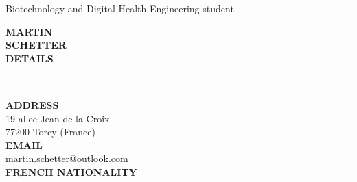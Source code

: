 \documentclass[9pt,a4paper]{article}
\newcommand{\myname}[1]{\textbf{\huge\selectfont\MakeUppercase{#1}}\\}
\newcommand{\myjobtitle}[1]{{\Large #1}\\}
\newcommand{\myline}[1]{\rule{#1}{1.0pt}\\}
\newcommand{\topic}[1]{\textbf{\Large\selectfont\MakeUppercase{#1}}\\\vspace{-1em}\myline{1.0cm}}
\newcommand{\uppersubtopic}[1]{\textbf{\normalsize\selectfont\MakeUppercase{#1}}\\}
\begin{document}
\begin{flushleft}
    \myjobtitle{{\color{FireBrick}Biotechnology and Digital Health Engineering-student}} %
\end{flushleft}
\vspace{-0.5em}


\noindent
\begin{minipage}[c]{0.3\linewidth}



\begin{flushleft}
    \myname{Martin} %
  \myname{SCHETTER} %

\vspace{1em}
\topic{DETAILS}
\uppersubtopic{address} 
19 allee Jean de la Croix\\
77200 Torcy (France)\\
\uppersubtopic{email}
martin.schetter@outlook.com\\ 
\uppersubtopic{French Nationality}
\vspace{0.1em} 


\end{flushleft}
\end{minipage}
\end{document}
